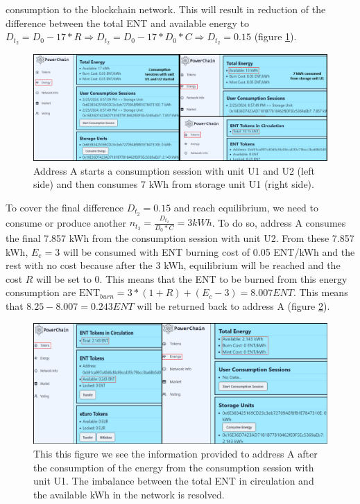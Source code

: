 consumption to the blockchain network. This will result in reduction of the difference between the total ENT and available energy to $D_{t_2} = D_0 - 17*R \Rightarrow 
D_{t_2} = D_0 - 17*D_0*C \Rightarrow D_{t_2} = 0.15$ (figure \ref{fig:reduce_imbalance_2}).
\begin{figure}[h!]
    \centering
    \includegraphics[width=\linewidth,frame,scale=1]{Figures/reduce_imbalance_2.png}
    \caption{Address A starts a consumption session with unit U1 and U2 (left side) and then consumes 7 kWh from storage unit U1 (right side).}
    \label{fig:reduce_imbalance_2}
\end{figure}
To cover the final difference $D_{t_2} = 0.15$ and reach equilibrium, we need to consume or produce another $n_{t_3} = \frac{D_{t_2}}{D_0*C} = 3 kWh$. To do
so, address A consumes the final 7.857 kWh from the consumption session with unit U2. From these 7.857 kWh, $E_e=3$ will be consumed with ENT burning cost of 0.05 ENT/kWh
and the rest with no cost because after the 3 kWh, equilibrium will be reached and the cost $R$ will be set to 0. This means that the ENT to be burned from this energy
consumption are $\textrm{ENT}_{burn} = 3*(1+R) + (E_c-3) = 8.007 ENT$. This means that $8.25 - 8.007 = 0.243 ENT$ will be returned back to address A (figure \ref{fig:resolve_imbalance}). \\
\begin{figure}[h!]
    \centering
    \includegraphics[width=\linewidth,frame,scale=1]{Figures/resolve_imbalance.png}
    \caption{This this figure we see the information provided to address A after the consumption of the energy from the consumption session with unit U1. The imbalance between the total
    ENT in circulation and the available kWh in the network is resolved.}
    \label{fig:resolve_imbalance}
\end{figure}
